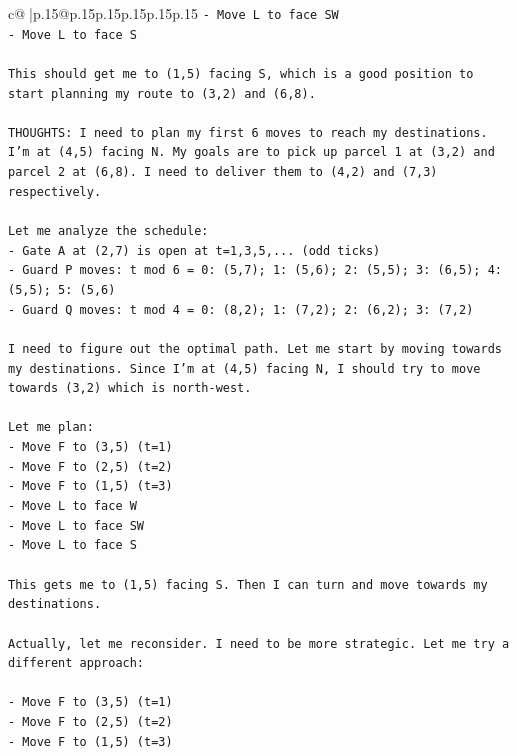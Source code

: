 \documentclass{article}
\begin{document}
{\begin{supertabular}{c@{$\;$}|p{.15\linewidth}@{}p{.15\linewidth}p{.15\linewidth}p{.15\linewidth}p{.15\linewidth}p{.15\linewidth}}
{{{\texttt{{-} Move L to face SW} \\
\texttt{{-} Move L to face S} \\
\\ 
\texttt{This should get me to (1,5) facing S, which is a good position to start planning my route to (3,2) and (6,8).} \\
\\ 
\texttt{THOUGHTS: I need to plan my first 6 moves to reach my destinations. I'm at (4,5) facing N. My goals are to pick up parcel 1 at (3,2) and parcel 2 at (6,8). I need to deliver them to (4,2) and (7,3) respectively.} \\
\\ 
\texttt{Let me analyze the schedule:} \\
\texttt{{-} Gate A at (2,7) is open at t=1,3,5,... (odd ticks)} \\
\texttt{{-} Guard P moves: t mod 6 = 0: (5,7); 1: (5,6); 2: (5,5); 3: (6,5); 4: (5,5); 5: (5,6)} \\
\texttt{{-} Guard Q moves: t mod 4 = 0: (8,2); 1: (7,2); 2: (6,2); 3: (7,2)} \\
\\ 
\texttt{I need to figure out the optimal path. Let me start by moving towards my destinations. Since I'm at (4,5) facing N, I should try to move towards (3,2) which is north{-}west.} \\
\\ 
\texttt{Let me plan:} \\
\texttt{{-} Move F to (3,5) (t=1)} \\
\texttt{{-} Move F to (2,5) (t=2)} \\
\texttt{{-} Move F to (1,5) (t=3)} \\
\texttt{{-} Move L to face W} \\
\texttt{{-} Move L to face SW} \\
\texttt{{-} Move L to face S} \\
\\ 
\texttt{This gets me to (1,5) facing S. Then I can turn and move towards my destinations.} \\
\\ 
\texttt{Actually, let me reconsider. I need to be more strategic. Let me try a different approach:} \\
\\ 
\texttt{{-} Move F to (3,5) (t=1)} \\
\texttt{{-} Move F to (2,5) (t=2)} \\
\texttt{{-} Move F to (1,5) (t=3)} \\
}}}
\end{supertabular}}
\end{document}
